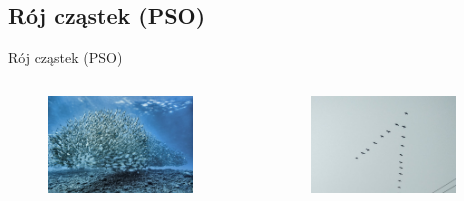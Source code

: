 \documentclass[handout]{beamer}
\begin{document}
\subsection{Rój cząstek (PSO)}
\begin{frame}{Rój cząstek (PSO)}

\vspace{-.7cm}
\begin{columns}
\begin{column}[t]{0.5\textwidth}

\begin{figure}[t]
\includegraphics[width=0.9\textwidth]{grafiki/lawicaRyb.jpg}
\end{figure}

\end{column}
\begin{column}[t]{0.5\textwidth}

\begin{figure}[t]
\includegraphics[width=0.9\textwidth]{grafiki/kluczPtakow.jpg}
\end{figure}


\end{column}
\end{columns}
\end{frame}
\end{document}
